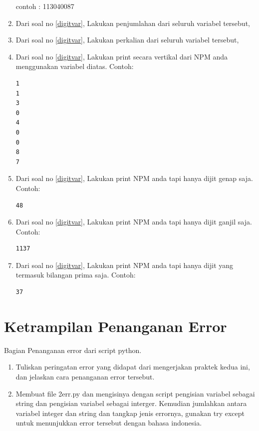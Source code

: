 \begin{enumerate}
contoh : 113040087
\item
Dari soal no \ref{digitvar}, Lakukan penjumlahan dari seluruh variabel tersebut,
\item 
Dari soal no \ref{digitvar}, Lakukan perkalian dari seluruh variabel tersebut,
\item
Dari soal no \ref{digitvar}, Lakukan print secara vertikal dari NPM anda menggunakan variabel diatas. Contoh:
\begin{verbatim}
1
1
3
0
4
0
0
8
7
\end{verbatim}
\item
Dari soal no \ref{digitvar}, Lakukan print NPM anda tapi hanya dijit genap saja. Contoh:
\begin{verbatim}
48
\end{verbatim}
\item
Dari soal no \ref{digitvar}, Lakukan print NPM anda tapi hanya dijit ganjil saja. Contoh:
\begin{verbatim}
1137
\end{verbatim}
\item 
Dari soal no \ref{digitvar}, Lakukan print NPM anda tapi hanya dijit yang termasuk bilangan prima saja. Contoh:
\begin{verbatim}
37
\end{verbatim}
\end{enumerate}


\section{Ketrampilan Penanganan Error}
Bagian Penanganan error dari script python.
\begin{enumerate}
\item
Tuliskan peringatan error yang didapat dari mengerjakan praktek kedua ini, dan jelaskan cara penanganan error tersebut.
\item
Membuat file 2err.py dan mengisinya dengan script pengisian variabel sebagai string dan pengisian variabel sebagai interger. 
Kemudian jumlahkan antara variabel integer dan string dan tangkap jenis errornya, gunakan try except untuk menunjukkan error tersebut dengan
bahasa indonesia.
\end{enumerate}

